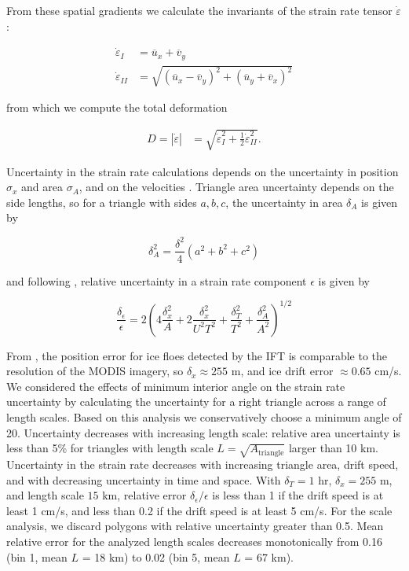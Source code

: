 \documentclass[review, jog]{igs}
\begin{document}
From these spatial gradients we calculate the invariants of the strain rate tensor $\dot\varepsilon$ \citep{lepparanta2011_DriftSea}:
\begin{linenomath*}
\begin{align}
    \dot\varepsilon_{I} &= \overline{u}_x + \overline{v}_y \\\dot\varepsilon_{II} &= \sqrt{(\overline{u}_x - \overline{v}_y)^2 + (\overline{u}_y + \overline{v}_x)^2} 
\end{align}
\end{linenomath*}
from which we compute the total deformation
\begin{linenomath*}
\begin{align}
   D = |\dot\varepsilon| &= \sqrt{\dot\varepsilon_{I}^2 + \frac{1}{2}\dot\varepsilon_{II}^2}.
\end{align}
\end{linenomath*}
Uncertainty in the strain rate calculations depends on the uncertainty in position $\sigma_x$ and area $\sigma_A$, and on the velocities \citep{Dierking2020}.
Triangle area uncertainty depends on the side lengths, so for a triangle with sides $a, b, c$, the uncertainty in area $\delta_A$ is given by
\begin{linenomath*}
\begin{equation}
\delta_A^2 = \frac{\delta^2}{4}(a^2 + b^2 + c^2)
\end{equation}
\end{linenomath*} %
and following \cite{Hutchings2012}, relative uncertainty in a strain rate component $\epsilon$
is given by
\begin{linenomath*}
\begin{equation}
    \frac{\delta_\epsilon}{\epsilon} = 2\left(4 \frac{\delta_x^2}{A} + 2 \frac{\delta_x^2}{U^2T^2} + \frac{\delta_T^2}{T^2} + \frac{\delta_A^2}{A^2}\right)^{1/2}
\end{equation}
\end{linenomath*}
From \cite{lopez-acosta2019_IceFloe}, the position error for ice floes detected by the IFT is comparable to the resolution of the MODIS imagery, so $\delta_x \approx 255$ m, and ice drift error $\approx 0.65$ cm/s. 
We considered the effects of minimum interior angle on the strain rate uncertainty by calculating the uncertainty for a right triangle across a range of length scales. Based on this analysis we conservatively choose a minimum angle of 20. Uncertainty decreases with increasing length scale:  relative area uncertainty is less than 5\% for triangles with length scale $L = \sqrt{A_{\text{triangle}}}$ larger than 10 km. 
Uncertainty in the strain rate decreases with increasing triangle area, drift speed, and with decreasing uncertainty in time and space.
With $\delta_T = 1$ hr, $\delta_x = 255$ m, and length scale $15$ km, relative error $\delta_\epsilon / \epsilon$ is less than 1 if the drift speed is at least 1 cm/s, and less than 0.2 if the drift speed is at least 5 cm/s. For the scale analysis, we discard polygons with relative uncertainty greater than 0.5.
Mean relative error for the analyzed length scales decreases monotonically from 0.16 (bin 1, mean $L$ = 18 km) to 0.02 (bin 5, mean $L$ = 67 km).
\end{document}
